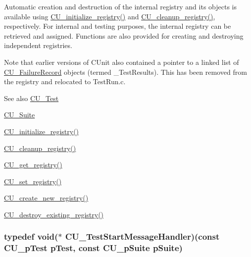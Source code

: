 Automatic creation and destruction of the internal registry and its objects is available using \hyperlink{group___framework_ga3477b2d3e57c8f8aba36bbbdfa54920d}{C\+U\+\_\+initialize\+\_\+registry()} and \hyperlink{group___framework_ga183eb7d7f79e149c767237cfef52cb82}{C\+U\+\_\+cleanup\+\_\+registry()}, respectively. For internal and testing purposes, the internal registry can be retrieved and assigned. Functions are also provided for creating and destroying independent registries. 

Note that earlier versions of C\+Unit also contained a pointer to a linked list of \hyperlink{struct_c_u___failure_record}{C\+U\+\_\+\+Failure\+Record} objects (termed \+\_\+\+Test\+Results). This has been removed from the registry and relocated to Test\+Run.\+c. \begin{DoxySeeAlso}{See also}
\hyperlink{struct_c_u___test}{C\+U\+\_\+\+Test} 

\hyperlink{struct_c_u___suite}{C\+U\+\_\+\+Suite} 

\hyperlink{group___framework_ga3477b2d3e57c8f8aba36bbbdfa54920d}{C\+U\+\_\+initialize\+\_\+registry()} 

\hyperlink{group___framework_ga183eb7d7f79e149c767237cfef52cb82}{C\+U\+\_\+cleanup\+\_\+registry()} 

\hyperlink{group___framework_gacdc4bab7b0492ed1e3a4e076677de22e}{C\+U\+\_\+get\+\_\+registry()} 

\hyperlink{group___framework_gaaec6d8893d61bfff165775385851562d}{C\+U\+\_\+set\+\_\+registry()} 

\hyperlink{group___framework_ga5d2ce564b228122842f515cb4e5beda2}{C\+U\+\_\+create\+\_\+new\+\_\+registry()} 

\hyperlink{group___framework_ga7c46b0ae888482411575c93d5d780b0d}{C\+U\+\_\+destroy\+\_\+existing\+\_\+registry()} 
\end{DoxySeeAlso}
\hypertarget{group___framework_ga3330df7f5c95933f4ba21c648933c928}{
\subsubsection[{C\+U\+\_\+\+Test\+Start\+Message\+Handler}]{\setlength{\rightskip}{0pt plus 5cm}typedef void($\ast$ C\+U\+\_\+\+Test\+Start\+Message\+Handler)(const {\bf C\+U\+\_\+p\+Test} p\+Test, const {\bf C\+U\+\_\+p\+Suite} p\+Suite)}}\label{group___framework_ga3330df7f5c95933f4ba21c648933c928}


